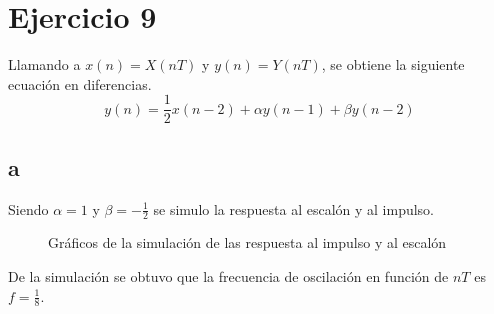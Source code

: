 \documentclass[../../guia1.tex]{subfiles}
\begin{document}
\section*{Ejercicio 9}
Llamando a $x(n)=X(nT)$ y $y(n)=Y(nT)$, se obtiene la siguiente ecuación en diferencias. 
\begin{equation}
y(n)=\frac{1}{2} x(n-2) + \alpha y(n-1) + \beta y(n-2)  
\end{equation}

\subsection*{a}
Siendo $\alpha = 1$ y $\beta = -\frac{1}{2}$ se simulo la respuesta al escalón y al impulso.
\begin{figure}[H]
 \centering

 \caption{Gráficos de la simulación de las respuesta al impulso y al escalón}
 \label{f:eja}
\end{figure}
De la simulación se obtuvo que la frecuencia de oscilación en función de $nT$ es $f= \frac{1}{8}$.
\end{document}
